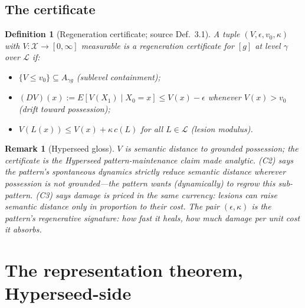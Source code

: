 \documentclass[11pt]{article}
\newtheorem{definition}{Definition}
\newtheorem{remark}{Remark}
\newcommand{\X}{\mathcal{X}}
\newcommand{\D}{D}
\newcommand{\Les}{\mathcal{L}}
\begin{document}
\subsection{The certificate}

\begin{definition}[Regeneration certificate; source Def.~3.1]\label{def:cert}
A tuple $(V, \epsilon, v_0, \kappa)$ with $V : \X \to [0,\infty]$ measurable is a
\emph{regeneration certificate} for $[g]$ at level $\gamma$ over $\Les$ if:
\begin{itemize}
\item[(C1)] $\{V \le v_0\} \subseteq A_{\gamma g}$ (sublevel containment);
\item[(C2)] $(\D V)(x) := E[V(X_1) \mid X_0 = x] \le V(x) - \epsilon$ whenever
$V(x) > v_0$ (drift toward possession);
\item[(C3)] $V(L(x)) \le V(x) + \kappa\, c(L)$ for all $L \in \Les$ (lesion modulus).
\end{itemize}
\end{definition}

\begin{remark}[Hyperseed gloss]
$V$ is \emph{semantic distance to grounded possession}; the certificate is the Hyperseed
pattern-maintenance claim made analytic. (C2) says the pattern's spontaneous dynamics
strictly reduce semantic distance wherever possession is not grounded---the pattern
\emph{wants} (dynamically) to regrow this sub-pattern. (C3) says damage is priced in the
same currency: lesions can raise semantic distance only in proportion to their cost. The
pair $(\epsilon, \kappa)$ is the pattern's \emph{regenerative signature}: how fast it
heals, how much damage per unit cost it absorbs.
\end{remark}

\section{The representation theorem, Hyperseed-side}
\end{document}
